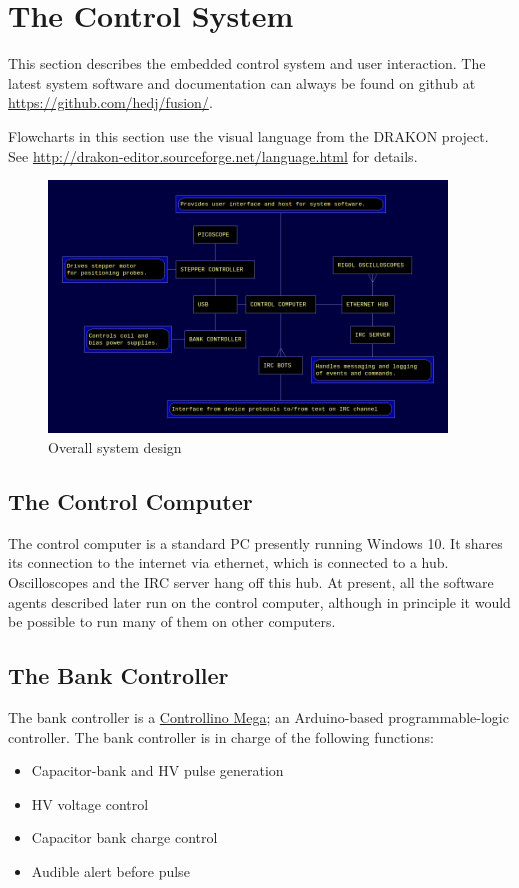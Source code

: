 
\section{The Control System}

This section describes the embedded control system and user interaction.
The latest system software and documentation can always be found on github at \url{https://github.com/hedj/fusion/}.

Flowcharts in this section use the visual language from the DRAKON project. See \url{http://drakon-editor.sourceforge.net/language.html} for details.

\begin{figure}
  \includegraphics[width=400px]{system_structure.png}
\caption{\label{fig:system} Overall system design}
\end{figure}

\subsection{The Control Computer}

The control computer is a standard PC presently running Windows 10. It shares its connection to the
internet via ethernet, which is connected to a hub. Oscilloscopes and the IRC server hang off this hub.
At present, all the software agents described later run on the control computer, although in principle
it would be possible to run many of them on other computers.

\subsection{The Bank Controller}

The bank controller is a \href{http://controllino.biz/product/controllino-mega/}{Controllino Mega}; an
Arduino-based programmable-logic controller. The bank controller is in charge of the following functions:
\begin{itemize}
  \item{Capacitor-bank and HV pulse generation}
  \item{HV voltage control}
  \item{Capacitor bank charge control}
  \item{Audible alert before pulse}
\end{itemize}

